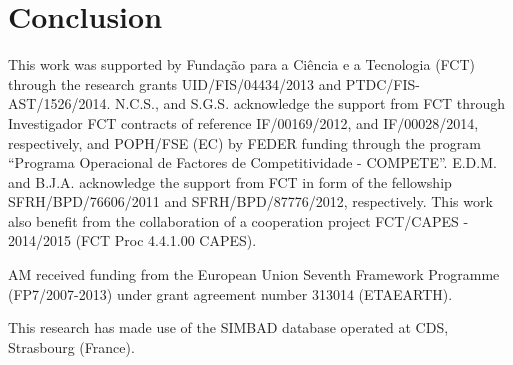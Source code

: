 \documentclass{aa}
\begin{document}
\section{Conclusion}
\label{sec:conclusion}




\begin{acknowledgements}

This work was supported by Funda\c{c}\~ao para a Ci\^encia e a Tecnologia (FCT)
through the research grants UID/FIS/04434/2013 and PTDC/FIS-AST/1526/2014.
N.C.S., and S.G.S. acknowledge the support from FCT through Investigador FCT
contracts of reference IF/00169/2012, and IF/00028/2014, respectively, and
POPH/FSE (EC) by FEDER funding through the program “Programa Operacional de
Factores de Competitividade - COMPETE”. E.D.M. and B.J.A. acknowledge the
support from FCT in form of the fellowship SFRH/BPD/76606/2011 and
SFRH/BPD/87776/2012, respectively. This work also benefit from the collaboration
of a cooperation project FCT/CAPES - 2014/2015 (FCT Proc 4.4.1.00 CAPES).

AM received funding from the European Union Seventh Framework Programme
(FP7/2007-2013) under grant agreement number 313014 (ETAEARTH).

This research has made use of the SIMBAD database operated at CDS, Strasbourg
(France).

\end{acknowledgements}





\clearpage
\appendix
\end{document}
